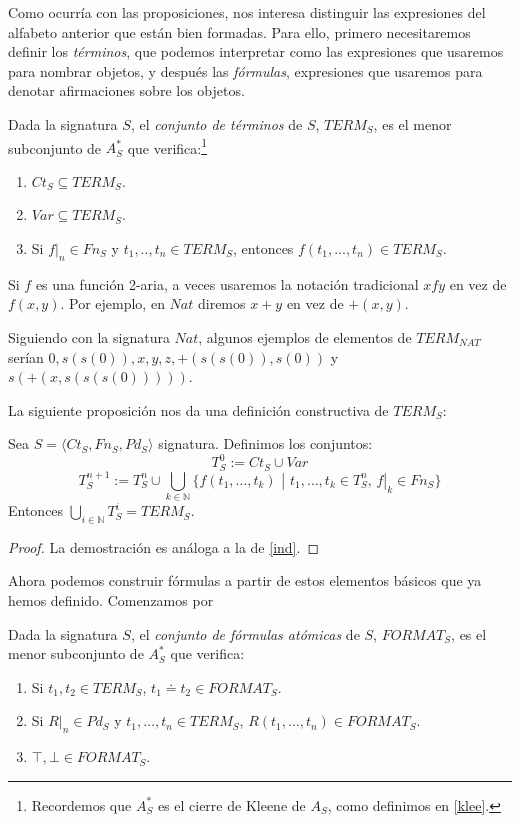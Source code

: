 Como ocurría con las proposiciones, nos interesa distinguir las expresiones del alfabeto anterior que están bien formadas. Para ello, primero necesitaremos definir los \textit{términos}, que podemos interpretar como las expresiones que usaremos para nombrar objetos, y después las \textit{fórmulas}, expresiones que usaremos para denotar afirmaciones sobre los objetos.

\begin{definition}\label{term}
Dada la signatura $S$, el \textit{conjunto de términos} de $S$, $TERM_S$, es el menor subconjunto de $A_{S}^*$ que verifica:\footnote{Recordemos que $A_{S}^*$ es el cierre de Kleene de $A_{S}$, como definimos en \ref{klee}.}
\begin{enumerate}
    \item $Ct_S\subseteq TERM_S$.
    \item $Var\subseteq TERM_S$.
    \item Si $f|_{n} \in Fn_S$ y $t_1, .., t_n \in TERM_S$, entonces $f(t_1, ..., t_n) \in TERM_S$. 
\end{enumerate}
\end{definition}

Si $f$ es una función 2-aria, a veces usaremos la notación tradicional $xfy$ en vez de $f(x,y)$. Por ejemplo, en $Nat$ diremos $x+y$ en vez de $+(x,y)$.

\begin{example}
Siguiendo con la signatura $Nat$, algunos ejemplos de elementos de $TERM_{NAT}$ serían  $0, s(s(0)), x, y, z,+(s(s(0)), s(0))$ y $s(+(x,s(s(s(0)))))$.
\end{example}

La siguiente proposición nos da una definición constructiva de $TERM_S$: 
\begin{prop}
Sea $S = \langle Ct_{S}, Fn_{S}, Pd_{S}\rangle$ signatura. Definimos los conjuntos:
$$T_{S}^{0} := Ct_S \cup Var$$
$$T_{S}^{n+1} := T_{S}^{n} \cup \bigcup\limits_{k \in \mathbb{N}} \{f(t_1, \dots, t_k) \, \, | \, \, t_1, \dots, t_k \in T_{S}^{n}, \, f|_{k} \in Fn_S\}$$
Entonces $\bigcup\limits_{i \in \mathbb{N}} T_{S}^{i} = TERM_S$.
\end{prop}
\begin{proof}
La demostración es análoga a la de \ref{ind}.
\end{proof}

Ahora podemos construir fórmulas a partir de estos elementos básicos que ya hemos definido. Comenzamos por 

\begin{definition}
Dada la signatura $S$, el \textit{conjunto de fórmulas atómicas} de $S$, $FORMAT_S$, es el menor subconjunto de $A_{S}^*$ que verifica:
\begin{enumerate}
    \item Si $t_1, t_2 \in TERM_S$, $t_1 \doteq t_2 \in FORMAT_S$.
    \item Si $R|_{n} \in Pd_S$ y $t_1, \dots, t_n \in TERM_S$, $R(t_1, \dots, t_n) \in FORMAT_S$.
    \item $\top, \bot \in FORMAT_S$.
\end{enumerate}
\end{definition}

